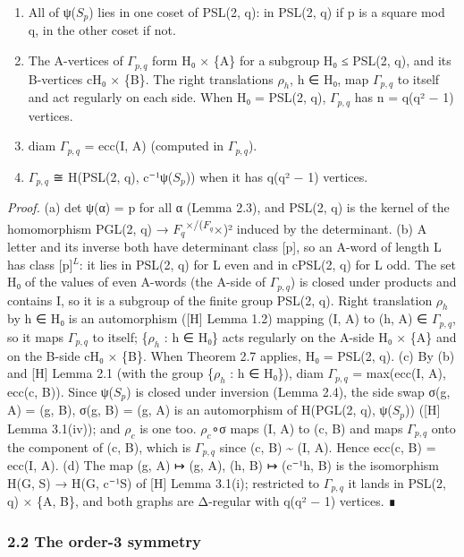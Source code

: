 \documentclass[
  10pt,
]{article}
\providecommand{\tightlist}{%
  \setlength{\itemsep}{0pt}\setlength{\parskip}{0pt}}
\begin{document}
\begin{enumerate}
\def\labelenumi{(\alph{enumi})}
\tightlist
\item
  All of ψ(\(S_{p}\)) lies in one coset of PSL(2, q): in PSL(2, q) if p
  is a square mod q, in the other coset if not.
\item
  The A-vertices of \(Γ_{p,q}\) form H₀ × \{A\} for a subgroup H₀ ≤
  PSL(2, q), and its B-vertices cH₀ × \{B\}. The right translations
  \(ρ_{h}\), h ∈ H₀, map \(Γ_{p,q}\) to itself and act regularly on each
  side. When H₀ = PSL(2, q), \(Γ_{p,q}\) has n = q(q² − 1) vertices.
\item
  diam \(Γ_{p,q}\) = ecc(I, A) (computed in \(Γ_{p,q}\)).
\item
  \(Γ_{p,q}\) ≅ H(PSL(2, q), c⁻¹ψ(\(S_{p}\))) when it has q(q² − 1)
  vertices.
\end{enumerate}

\emph{Proof.} (a) det ψ(α) = p for all α (Lemma 2.3), and PSL(2, q) is
the kernel of the homomorphism PGL(2, q) →
\(F_{q}\)\textsuperscript{×/(\(F_{q}\)}×)² induced by the determinant.
(b) A letter and its inverse both have determinant class {[}p{]}, so an
A-word of length L has class {[}p{]}\(^{L}\): it lies in PSL(2, q) for L
even and in cPSL(2, q) for L odd. The set H₀ of the values of even
A-words (the A-side of \(Γ_{p,q}\)) is closed under products and
contains I, so it is a subgroup of the finite group PSL(2, q). Right
translation \(ρ_{h}\) by h ∈ H₀ is an automorphism ({[}H{]} Lemma 1.2)
mapping (I, A) to (h, A) ∈ \(Γ_{p,q}\), so it maps \(Γ_{p,q}\) to
itself; \{\(ρ_{h}\) : h ∈ H₀\} acts regularly on the A-side H₀ × \{A\}
and on the B-side cH₀ × \{B\}. When Theorem 2.7 applies, H₀ = PSL(2, q).
(c) By (b) and {[}H{]} Lemma 2.1 (with the group \{\(ρ_{h}\) : h ∈
H₀\}), diam \(Γ_{p,q}\) = max(ecc(I, A), ecc(c, B)). Since ψ(\(S_{p}\))
is closed under inversion (Lemma 2.4), the side swap σ(g, A) = (g, B),
σ(g, B) = (g, A) is an automorphism of H(PGL(2, q), ψ(\(S_{p}\)))
({[}H{]} Lemma 3.1(iv)); and \(ρ_{c}\) is one too. \(ρ_{c}\)∘σ maps (I,
A) to (c, B) and maps \(Γ_{p,q}\) onto the component of (c, B), which is
\(Γ_{p,q}\) since (c, B) \textasciitilde{} (I, A). Hence ecc(c, B) =
ecc(I, A). (d) The map (g, A) ↦ (g, A), (h, B) ↦ (c⁻¹h, B) is the
isomorphism H(G, S) → H(G, c⁻¹S) of {[}H{]} Lemma 3.1(i); restricted to
\(Γ_{p,q}\) it lands in PSL(2, q) × \{A, B\}, and both graphs are
Δ-regular with q(q² − 1) vertices. ∎

\hypertarget{the-order-3-symmetry}{%
\subsubsection{2.2 The order-3 symmetry}\label{the-order-3-symmetry}}
\end{document}
